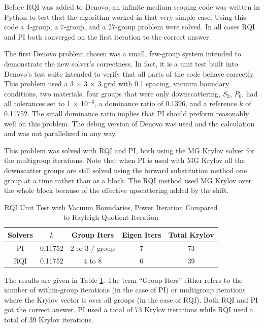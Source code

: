 Before RQI was added to Denovo, an infinite medium scoping code was written in Python to test that the algorithm worked in that very simple case.  Using this code a 4-group, a 7-group, and a 27-group problem were solved. In all cases RQI and PI both converged on the first iteration to the correct answer. 

The first Denovo problem chosen was a small, few-group system intended to demonstrate the new solver's correctness. In fact, it is a unit test built into Denovo's test suite intended to verify that all parts of the code behave correctly. This problem used a 3 $\times$ 3 $\times$ 3 grid with 0.1 spacing, vacuum boundary conditions, two materials, four groups that were only downscattering, $S_{2}$, $P_{0}$, had all tolerances set to 1 $\times$ 10$^{-6}$, a dominance ratio of 0.1396, and a reference $k$ of 0.11752. The small dominance ratio implies that PI should preform reasonably well on this problem. The debug version of Denovo was used and the calculation and was not parallelized in any way. 

This problem was solved with RQI and PI, both using the MG Krylov solver for the multigroup iterations. Note that when PI is used with MG Krylov all the downscatter groups are still solved using the forward substitution method one group at a time rather than as a block. The RQI method used MG Krylov over the whole block because of the effective upscattering added by the shift. 

\begin{table}[!h]
\caption{RQI Unit Test with Vacuum Boundaries, Power Iteration Compared to Rayleigh Quotient Iteration}
\begin{center}
\begin{tabular}{| c | c | c | c | c |}
\hline
Solvers & $k$ & Group Iters & Eigen Iters & Total Krylov \\[0.5ex]
\hline
PI &  0.11752 &  2 or 3 / group & 7 & 73 \\
RQI &  0.11752 & 4 to 8 & 6 & 39 \\
\hline
\end{tabular}
\end{center}
\label{table:SmallVacuumRQI}
\end{table}
%
The results are given in Table \ref{table:SmallVacuumRQI}. The term ``Group Iters'' either refers to the number of within-group iterations (in the case of PI) or multigroup iterations where the Krylov vector is over all groups (in the case of RQI). Both RQI and PI got the correct answer. PI used a total of 73 Krylov iterations while RQI used a total of 39 Krylov iterations. 

